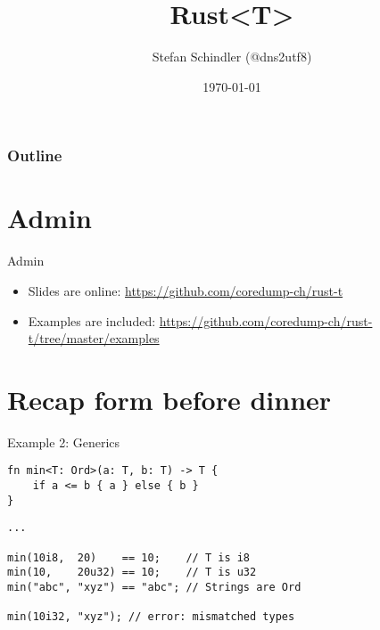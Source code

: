 \documentclass[aspectratio=1610,t]{beamer}
\title{Rust<T>}
\date{\today}
\author{Stefan Schindler (@dns2utf8)}
\institute{Coredump Rapperswil}
\begin{document}
{
\maketitle
}


\begin{frame}[noframenumbering]
	\frametitle{Outline}
	\tableofcontents
\end{frame}



\section{Admin}

\begin{frame}[fragile]{Admin}

\begin{itemize}
  \item Slides are online:
        \url{https://github.com/coredump-ch/rust-t}
  \item Examples are included:
        \url{https://github.com/coredump-ch/rust-t/tree/master/examples}
\end{itemize}

\end{frame}


\section{Recap form before dinner}

\begin{frame}[fragile]{Example 2: Generics}

\begin{verbatim}
fn min<T: Ord>(a: T, b: T) -> T {
    if a <= b { a } else { b }
}
\end{verbatim}
\pause
\begin{verbatim}
...

min(10i8,  20)    == 10;    // T is i8
min(10,    20u32) == 10;    // T is u32
min("abc", "xyz") == "abc"; // Strings are Ord

min(10i32, "xyz"); // error: mismatched types
\end{verbatim}

\end{frame}
\end{document}
